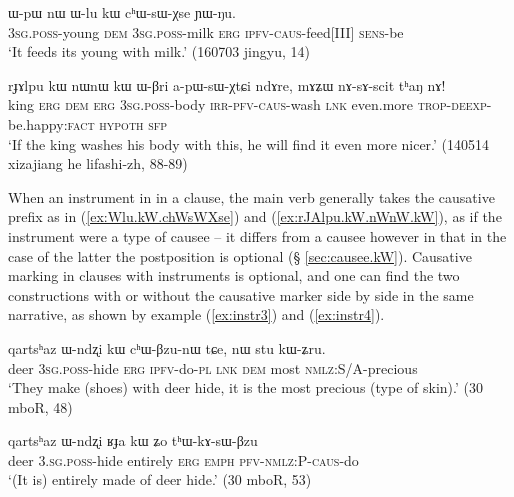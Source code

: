 \begin{exe}
\ex \label{ex:Wlu.kW.chWsWXse}
 \gll ɯ-pɯ nɯ ɯ-lu kɯ cʰɯ-sɯ-χse ɲɯ-ŋu. \\
 \textsc{3sg}.\textsc{poss}-young \textsc{dem} \textsc{3sg}.\textsc{poss}-milk \textsc{erg} \textsc{ipfv}-\textsc{caus}-feed[III] \textsc{sens}-be \\
\glt `It feeds its young with milk.' (160703 jingyu, 14)
\end{exe}

\begin{exe}
\ex \label{ex:rJAlpu.kW.nWnW.kW}
 \gll  rɟɤlpu kɯ nɯnɯ kɯ ɯ-βri a-pɯ-sɯ-χtɕi ndɤre, mɤʑɯ nɤ-sɤ-scit tʰaŋ nɤ!\\
 king \textsc{erg} \textsc{dem} \textsc{erg} \textsc{3sg}.\textsc{poss}-body \textsc{irr}-\textsc{pfv}-\textsc{caus}-wash \textsc{lnk} even.more \textsc{trop}-\textsc{deexp}-be.happy:\textsc{fact} \textsc{hypoth} \textsc{sfp} \\
 \glt `If the king washes his body with this, he will find it even more nicer.' (140514 xizajiang he lifashi-zh, 88-89)
\end{exe}

When an instrument in  in a clause, the main verb generally takes the causative prefix as in (\ref{ex:Wlu.kW.chWsWXse}) and (\ref{ex:rJAlpu.kW.nWnW.kW}), as if the instrument were a type of causee -- it differs from a causee however in that in the case of the latter the postposition  is optional (§ \ref{sec:causee.kW}). Causative marking in clauses with  instruments is optional, and one can find the two constructions with or without the causative marker side by side in the same narrative, as shown by example (\ref{ex:instr3}) and (\ref{ex:instr4}).

\begin{exe} 
\ex \label{ex:instr3}
\gll   qartsʰaz  ɯ-ndʐi kɯ cʰɯ-βzu-nɯ tɕe, nɯ stu kɯ-ʑru.   \\
 deer \textsc{3sg.poss}-hide \textsc{erg} \textsc{ipfv}-do-\textsc{pl} \textsc{lnk} \textsc{dem} most \textsc{nmlz:S/A}-precious \\
 \glt   `They make (shoes) with deer hide, it is the most precious (type of skin).' (30 mboR, 48)
\end{exe} 

 \begin{exe} 
\ex \label{ex:instr4}
\gll   qartsʰaz ɯ-ndʐi ʁɟa kɯ ʑo tʰɯ-kɤ-sɯ-βzu  \\
 deer \textsc{3.sg.poss}-hide entirely \textsc{erg} \textsc{emph} \textsc{pfv-nmlz:P-caus}-do\\
 \glt   `(It is) entirely made of deer hide.' (30 mboR, 53)
\end{exe} 

